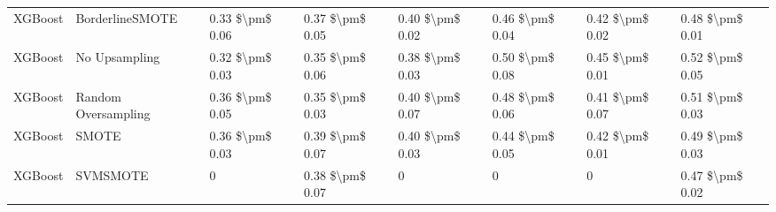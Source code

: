 \begin{tabular}{llllllll}
                        XGBoost &               BorderlineSMOTE & 0.33 \$\textbackslash pm\$ 0.06 &           0.37 \$\textbackslash pm\$ 0.05 &       0.40 \$\textbackslash pm\$ 0.02 &        0.46 \$\textbackslash pm\$ 0.04 &                         0.42 \$\textbackslash pm\$ 0.02 &     0.48 \$\textbackslash pm\$ 0.01 \\
                        XGBoost &                 No Upsampling & 0.32 \$\textbackslash pm\$ 0.03 &           0.35 \$\textbackslash pm\$ 0.06 &       0.38 \$\textbackslash pm\$ 0.03 &        0.50 \$\textbackslash pm\$ 0.08 &                         0.45 \$\textbackslash pm\$ 0.01 &     0.52 \$\textbackslash pm\$ 0.05 \\
                        XGBoost &           Random Oversampling & 0.36 \$\textbackslash pm\$ 0.05 &           0.35 \$\textbackslash pm\$ 0.03 &       0.40 \$\textbackslash pm\$ 0.07 &        0.48 \$\textbackslash pm\$ 0.06 &                         0.41 \$\textbackslash pm\$ 0.07 &     0.51 \$\textbackslash pm\$ 0.03 \\
                        XGBoost &                         SMOTE & 0.36 \$\textbackslash pm\$ 0.03 &           0.39 \$\textbackslash pm\$ 0.07 &       0.40 \$\textbackslash pm\$ 0.03 &        0.44 \$\textbackslash pm\$ 0.05 &                         0.42 \$\textbackslash pm\$ 0.01 &     0.49 \$\textbackslash pm\$ 0.03 \\
                        XGBoost &                      SVMSMOTE &               0 &           0.38 \$\textbackslash pm\$ 0.07 &                     0 &                      0 &                                       0 &     0.47 \$\textbackslash pm\$ 0.02 \\
\bottomrule
\end{tabular}
